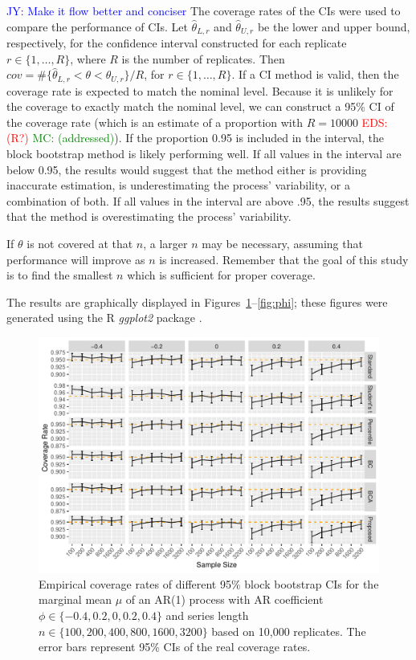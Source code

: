 \documentclass[12pt, letterpaper, titlepage]{article}
\newcommand{\jy}[1]{\textcolor{blue}{JY: #1}}
\newcommand{\eds}[1]{\textcolor{red}{EDS: (#1)}}
\newcommand{\mc}[1]{\textcolor{green}{MC: (#1)}}
\begin{document}
\jy{Make it flow better and conciser}
The coverage rates of the CIs were used to compare the performance of CIs. Let
$\hat\theta_{L, r}$ and $\hat\theta_{U, r}$ be the lower and upper bound,
respectively, for the confidence interval constructed for each replicate
$r \in \{1, \ldots, R\}$, where $R$ is the
number of replicates.
Then $cov = \#\{\hat\theta_{L, r} < \theta < \hat\theta_{U, r} \}/R$,  
for $r \in \{1, \ldots, R\}$.
If a CI method is valid, then the coverage rate is expected to match the
nominal 
level. Because it is unlikely for the coverage to exactly match the nominal
level,
we can construct a 95\% CI of the coverage
rate (which is an estimate of a proportion with $R = 10000$ \eds{R?} \mc{addressed}). If the
proportion
0.95 is included in the interval, the block bootstrap method is likely
performing
well. If all values in the interval are below 0.95, the results would suggest 
that the
method either is providing inaccurate estimation, is underestimating the
process' variability, or a combination of both. If all values in the interval
are above .95, the results suggest that the method is overestimating the
process' variability.

If $\theta$ is not covered at that $n$, a larger $n$ may be
necessary, assuming that performance will improve as $n$ is increased.
Remember that
the goal of this study is to find the smallest $n$ which is sufficient for
proper coverage.

The results are graphically displayed in Figures~\ref{fig:mu}--\ref{fig:phi};
these figures were generated using the R \textsl{ggplot2} package
\citep{ggplot2}.

\begin{figure}[tbp]
  \centering
  \includegraphics[width=\textwidth]{figures/plot_norm_mu}
  \caption{Empirical coverage rates of different 95\% block bootstrap CIs for
    the marginal mean $\mu$ of an AR(1) process with AR coefficient
    $\phi \in \{-0.4, 0.2, 0, 0.2, 0.4\}$ and series length
    $n \in \{100, 200, 400, 800, 1600, 3200\}$ based on 10,000 replicates.
    The error bars represent 95\% CIs of the real coverage rates.}
  \label{fig:mu}
\end{figure}
\end{document}
